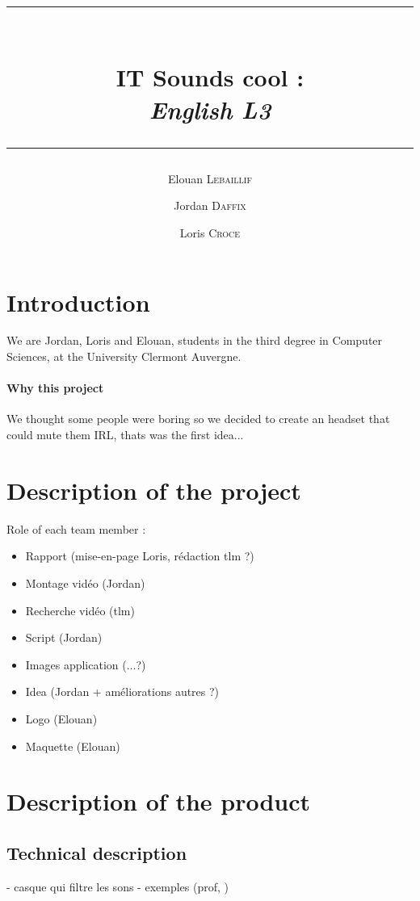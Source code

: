 \documentclass[12pt, a4paper]{article}
\author{Elouan \textsc{Lebaillif} \and Jordan \textsc{Daffix} \and Loris \textsc{Croce}}
\title{\rule{\textwidth}{1pt} \\ \Huge\textbf{IT Sounds cool : } \\ \emph{English L3} \rule{\textwidth}{1pt}}
\begin{document}
\maketitle{}

\tableofcontents

\section{Introduction}

We are Jordan, Loris and Elouan, students in the third degree in Computer Sciences, at the University Clermont Auvergne.

\paragraph{Why this project}
We thought some people were boring so we decided to create an headset that could mute them IRL, thats was the first idea...

\section{Description of the project}

Role of each team member :

\begin{itemize}
    \item Rapport (mise-en-page Loris, rédaction tlm ?)
    \item Montage vidéo (Jordan)
    \item Recherche vidéo (tlm)
    \item Script (Jordan)
    \item Images application (...?)
    \item Idea  (Jordan + améliorations autres ?)
    \item Logo (Elouan)
    \item Maquette (Elouan)
\end{itemize}

\section{Description of the product}

    \subsection{Technical description}
        - casque qui filtre les sons
        - exemples (prof, )
\end{document}
